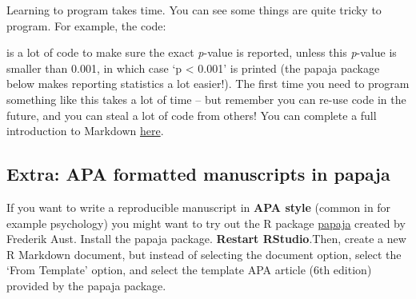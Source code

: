 \documentclass[
  oneside]{krantz}
\makeatletter
\newenvironment{Shaded}{\begin{snugshade}}{\end{snugshade}}
\newcommand{\AttributeTok}[1]{\textcolor[rgb]{0.61,0.61,0.61}{#1}}
\newcommand{\DecValTok}[1]{\textcolor[rgb]{0.06,0.06,0.06}{#1}}
\newcommand{\FloatTok}[1]{\textcolor[rgb]{0.06,0.06,0.06}{#1}}
\newcommand{\FunctionTok}[1]{\textcolor[rgb]{0,0,0}{#1}}
\newcommand{\NormalTok}[1]{#1}
\newcommand{\SpecialCharTok}[1]{\textcolor[rgb]{0,0,0}{#1}}
\newcommand{\StringTok}[1]{\textcolor[rgb]{0.5,0.5,0.5}{#1}}
\newenvironment{kframe}{%
\medskip{}
\setlength{\fboxsep}{.8em}
 \def\at@end@of@kframe{}%
 \ifinner\ifhmode%
  \def\at@end@of@kframe{\end{minipage}}%
  \begin{minipage}{\columnwidth}%
 \fi\fi%
 \def\FrameCommand##1{\hskip\@totalleftmargin \hskip-\fboxsep
 \colorbox{shadecolor}{##1}\hskip-\fboxsep
     \hskip-\linewidth \hskip-\@totalleftmargin \hskip\columnwidth}%
 \MakeFramed {\advance\hsize-\width
   \@totalleftmargin\z@ \linewidth\hsize
   \@setminipage}}%
 {\par\unskip\endMakeFramed%
 \at@end@of@kframe}
\renewenvironment{Shaded}{\begin{kframe}}{\end{kframe}}
\makeatother
\begin{document}
Learning to program takes time. You can see some things are quite tricky to
program. For example, the code:

\begin{Shaded}
\end{Shaded}

is a lot of code to make sure the exact \emph{p}-value is reported, unless this
\emph{p}-value is smaller than 0.001, in which case `p \textless{} 0.001' is printed (the papaja
package below makes reporting statistics a lot easier!). The first time you need
to program something like this takes a lot of time -- but remember you can re-use
code in the future, and you can steal a lot of code from others! You can
complete a full introduction to Markdown
\href{https://rmarkdown.rstudio.com/articles_intro.html}{here}.

\hypertarget{extra-apa-formatted-manuscripts-in-papaja}{%
\subsection{Extra: APA formatted manuscripts in papaja}\label{extra-apa-formatted-manuscripts-in-papaja}}

If you want to write a reproducible manuscript in \textbf{APA style} (common in for
example psychology) you might want to try out the R package
\href{https://github.com/crsh/papaja}{papaja} created by Frederik Aust. Install the
papaja package. \textbf{Restart RStudio}.Then, create a new R Markdown document, but
instead of selecting the document option, select the `From Template' option, and
select the template APA article (6th edition) provided by the papaja package.
\end{document}
